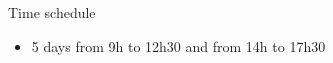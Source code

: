 \begin{frame}{Time schedule}
  \begin{itemize}
  \item 5 days from 9h to 12h30 and from 14h to 17h30 
  \end{itemize}
\end{frame}
